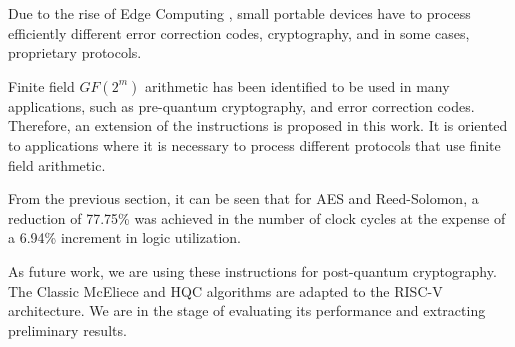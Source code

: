 Due to the rise of Edge Computing \cite{7488250}, small portable devices have to process 
efficiently different error correction codes, cryptography, 
and in some cases, proprietary protocols.

Finite field $GF(2^m)$ arithmetic has been identified to be used in many applications, such as pre-quantum cryptography, and error correction codes. Therefore, an extension of the instructions is proposed in this work. 
It is oriented to applications where it is necessary to process different protocols that use finite field arithmetic.

From the previous section, it can be seen that for AES and Reed-Solomon, a reduction of 77.75\% was achieved 
in the number of clock cycles at the expense of a 6.94\% increment in logic utilization.

As future work, we are using these instructions for post-quantum cryptography. The Classic McEliece and HQC algorithms are adapted to the RISC-V architecture. We are in the stage of evaluating its performance and extracting preliminary results.

